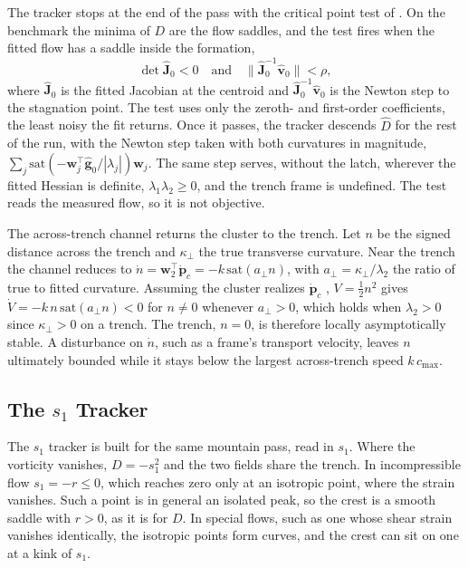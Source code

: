 \documentclass[lettersize,journal]{IEEEtran}
\begin{document}
The tracker stops at the end of the pass with the critical point test of
\cite{10}. On the benchmark the minima of $D$ are the flow saddles, and
the test fires when the fitted flow has a saddle inside the formation,
\begin{equation}
    \det\hat{\mathbf{J}}_0 < 0
    \quad\text{and}\quad
    \bigl\|\hat{\mathbf{J}}_0^{-1}\hat{\mathbf{v}}_0\bigr\| < \rho,
    \label{eq:d_capture}
\end{equation}
where $\hat{\mathbf{J}}_0$ is the fitted Jacobian at the centroid and
$\hat{\mathbf{J}}_0^{-1}\hat{\mathbf{v}}_0$ is the Newton step to the
stagnation point. The test uses only the zeroth- and first-order
coefficients, the least noisy the fit returns. Once it passes, the tracker
descends $\hat{D}$ for the rest of the run, with the Newton step taken
with both curvatures in magnitude, $\sum_j
\mathrm{sat}(-\mathbf{w}_j^\top\hat{\mathbf{g}}_0/|\lambda_j|)\mathbf{w}_j$.
The same step serves, without the latch, wherever the fitted Hessian is
definite, $\lambda_1\lambda_2 \geq 0$, and the trench frame is undefined.
The test reads the measured flow, so it is not objective.

The across-trench channel returns the cluster to the trench. Let $n$ be
the signed distance across the trench and $\kappa_\perp$ the true
transverse curvature. Near the trench the channel reduces to
$\dot{n} = \mathbf{w}_2^\top\dot{\mathbf{p}}_c = -k\,\mathrm{sat}(a_\perp n)$,
with $a_\perp = \kappa_\perp/\lambda_2$ the ratio of true to fitted
curvature. Assuming the cluster realizes $\dot{\mathbf{p}}_c$ \cite{37,3},
$V = \tfrac{1}{2}n^2$ gives $\dot{V} = -k\,n\,\mathrm{sat}(a_\perp n) < 0$
for $n \neq 0$ whenever $a_\perp > 0$, which holds when $\lambda_2 > 0$
since $\kappa_\perp > 0$ on a trench. The trench, $n = 0$, is therefore
locally asymptotically stable. A disturbance on $\dot{n}$, such as a
frame's transport velocity, leaves $n$ ultimately bounded while it stays
below the largest across-trench speed $k\,c_{\max}$.

\subsection{The $s_1$ Tracker}
\label{sec:s1_controller}

The $s_1$ tracker is built for the same mountain pass, read in $s_1$.
Where the vorticity vanishes, $D = -s_1^2$ and the two fields share the
trench. In incompressible flow
$s_1 = -r \leq 0$, which reaches zero only at an isotropic point, where the
strain vanishes. Such a point is in general an isolated peak, so the crest
is a smooth saddle with $r > 0$, as it is for $D$. In special flows, such
as one whose shear strain vanishes identically, the isotropic points form
curves, and the crest can sit on one at a kink of $s_1$.
\end{document}
